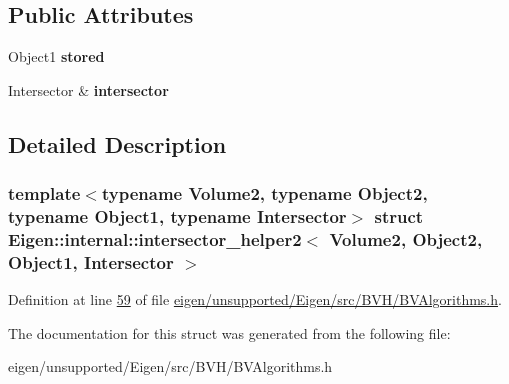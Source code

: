 \subsection*{Public Attributes}
\begin{DoxyCompactItemize}
\item 
\mbox{\label{struct_eigen_1_1internal_1_1intersector__helper2_a5e6251d5307854a2062befd84f4fbb4a}} 
Object1 {\bfseries stored}
\item 
\mbox{\label{struct_eigen_1_1internal_1_1intersector__helper2_ad9c5365a20212acbcf0cb65def405e71}} 
Intersector \& {\bfseries intersector}
\end{DoxyCompactItemize}


\subsection{Detailed Description}
\subsubsection*{template$<$typename Volume2, typename Object2, typename Object1, typename Intersector$>$\newline
struct Eigen\+::internal\+::intersector\+\_\+helper2$<$ Volume2, Object2, Object1, Intersector $>$}



Definition at line \hyperlink{eigen_2unsupported_2_eigen_2src_2_b_v_h_2_b_v_algorithms_8h_source_l00059}{59} of file \hyperlink{eigen_2unsupported_2_eigen_2src_2_b_v_h_2_b_v_algorithms_8h_source}{eigen/unsupported/\+Eigen/src/\+B\+V\+H/\+B\+V\+Algorithms.\+h}.



The documentation for this struct was generated from the following file\+:\begin{DoxyCompactItemize}
\item 
eigen/unsupported/\+Eigen/src/\+B\+V\+H/\+B\+V\+Algorithms.\+h\end{DoxyCompactItemize}
